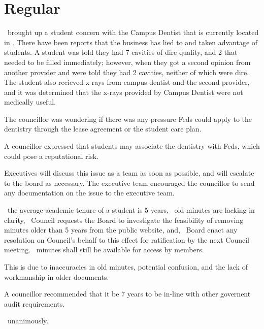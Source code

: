
\section*{Regular}

\begin{information}
    \seneca\ brought up a student concern with the Campus Dentist that is currently
    located in \slc. There have been reports that the business has lied to and
    taken advantage of students. A student was told they had 7 cavities of dire
    quality, and 2 that needed to be filled immediately; however, when they got
    a second opinion from another provider and were told they had 2 cavities,
    neither of which were dire. The student also recieved x-rays from campus
    dentist and the second provider, and it was determined that the x-rays 
    provided by Campus Dentist were not medically useful.

    The councillor was wondering if there was any pressure Feds could apply to
    the dentistry through the lease agreement or the student care plan.

    A councillor expressed that students may associate the dentistry with Feds,
    which could pose a reputational risk.

    Executives will discuss this issue as a team as soon as possible, and will
    escalate to the board as necessary. The executive team encouraged the
    councillor to send any documentation on the issue to the executive team.

\end{information}

\begin{motion}
    \whereas\ the average academic tenure of a student is 5 years,
    \whereas\ old minutes are lacking in clarity,
    \birt\ Council requests the Board to investigate the feasibility of 
    removing minutes older than 5 years from the public website, and,
    \bifrt\ Board enact any resolution on Council's behalf to this effect for
    ratification by the next Council meeting.
    \bifrt\ minutes shall still be available for access by members.
    \movers{\seneca}{\stephenie}

    This is due to inaccuracies in old minutes, potential confusion, and the
    lack of workmanship in older documents.

    A councillor recommended that it be 7 years to be in-line with other
    governent audit requirements.

    \carries\ unanimously. 

\end{motion}

